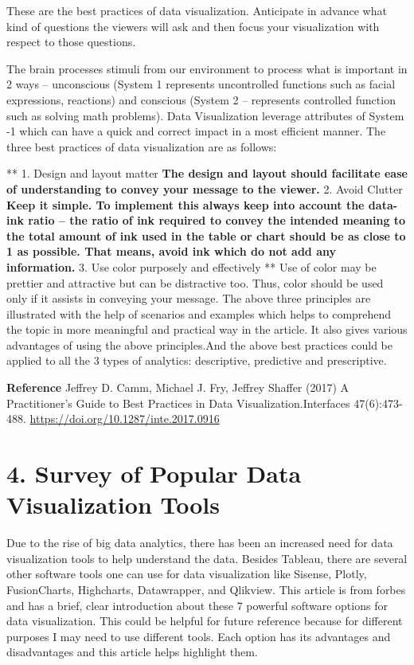 \documentclass[]{book}
\theoremstyle{definition}
\theoremstyle{definition}
\theoremstyle{definition}
\theoremstyle{remark}
\begin{document}
These are the best practices of data visualization. Anticipate in
advance what kind of questions the viewers will ask and then focus your
visualization with respect to those questions.

The brain processes stimuli from our environment to process what is
important in 2 ways -- unconscious (System 1 represents uncontrolled
functions such as facial expressions, reactions) and conscious (System 2
-- represents controlled function such as solving math problems). Data
Visualization leverage attributes of System -1 which can have a quick
and correct impact in a most efficient manner. The three best practices
of data visualization are as follows:

** 1. Design and layout matter \textbf{ The design and layout should
facilitate ease of understanding to convey your message to the viewer. }
2. Avoid Clutter \textbf{ Keep it simple. To implement this always keep
into account the data-ink ratio -- the ratio of ink required to convey
the intended meaning to the total amount of ink used in the table or
chart should be as close to 1 as possible. That means, avoid ink which
do not add any information. } 3. Use color purposely and effectively **
Use of color may be prettier and attractive but can be distractive too.
Thus, color should be used only if it assists in conveying your message.
The above three principles are illustrated with the help of scenarios
and examples which helps to comprehend the topic in more meaningful and
practical way in the article. It also gives various advantages of using
the above principles.And the above best practices could be applied to
all the 3 types of analytics: descriptive, predictive and prescriptive.

\textbf{Reference} Jeffrey D. Camm, Michael J. Fry, Jeffrey Shaffer
(2017) A Practitioner's Guide to Best Practices in Data
Visualization.Interfaces 47(6):473-488.
\url{https://doi.org/10.1287/inte.2017.0916}

\section{4. Survey of Popular Data Visualization
Tools}\label{survey-of-popular-data-visualization-tools}

Due to the rise of big data analytics, there has been an increased need
for data visualization tools to help understand the data. Besides
Tableau, there are several other software tools one can use for data
visualization like Sisense, Plotly, FusionCharts, Highcharts,
Datawrapper, and Qlikview. This article is from forbes and has a brief,
clear introduction about these 7 powerful software options for data
visualization. This could be helpful for future reference because for
different purposes I may need to use different tools. Each option has
its advantages and disadvantages and this article helps highlight them.
\end{document}
